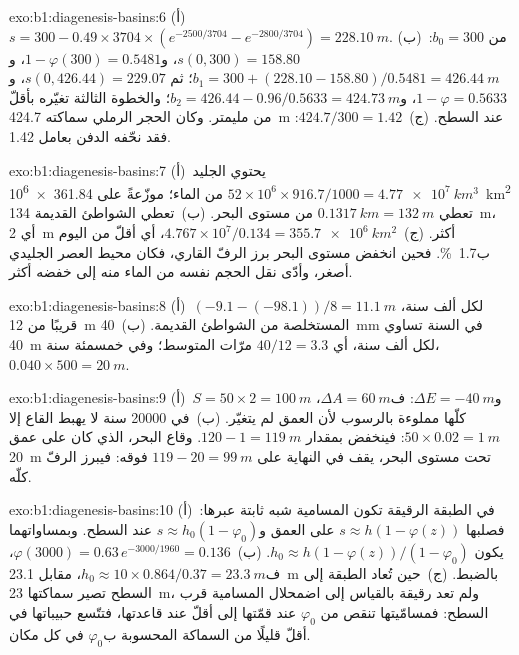\begin{solution}{exo:b1:diagenesis-basins:6}
(أ)~$s = 300 - 0.49\times3704\times(e^{-2500/3704} - e^{-2800/3704}) =
\qty{228.10}{m}$. (ب)~من $b_0 = 300$: $s(0, 300) = 158.80$، و$1 - \varphi(300) =
0.5481$، و$b_1 = 300 + (228.10 - 158.80)/0.5481 = \qty{426.44}{m}$؛ ثم
$s(0, 426.44) = 229.07$، و$1 - \varphi = 0.5633$، و$b_2 = 426.44 - 0.96/0.5633 =
\qty{424.73}{m}$؛ والخطوة الثالثة تغيّره بأقلّ من مليمتر. وكان الحجر الرملي سماكته \qty{424.7}{m} عند السطح. (ج)~$424.7/300 = 1.42$: فقد نحّفه الدفن بعامل \num{1.42}.
\end{solution}

\begin{solution}{exo:b1:diagenesis-basins:7}
(أ)~يحتوي الجليد $52\times10^6\times916.7/1000 = \qty{4.77e7}{km^3}$ من الماء؛ موزّعةً على \qty{361.84e6}{km^2} تعطي $\qty{0.1317}{km} = \qty{132}{m}$ من مستوى البحر. (ب)~تعطي الشواطئ القديمة \qty{134}{m}، أي \qty{2}{m} أكثر. (ج)~$4.767\times
10^7/0.134 = \qty{355.7e6}{km^2}$، أي أقلّ من اليوم ب\qty{1.7}{\%}. فحين انخفض مستوى البحر برز الرفّ القاري، فكان محيط العصر الجليدي أصغر، وأدّى نقل الحجم نفسه من الماء منه إلى خفضه أكثر.
\end{solution}

\begin{solution}{exo:b1:diagenesis-basins:8}
(أ)~$(-9.1 - (-98.1))/8 = \qty{11.1}{m}$ لكل ألف سنة، قريبًا من \qty{12}{m} المستخلصة من الشواطئ القديمة. (ب)~\qty{40}{mm} في السنة تساوي \qty{40}{m} لكل ألف سنة، أي $40/12 = 3.3$ مرّات المتوسط؛ وفي خمسمئة سنة، $0.040\times500 = \qty{20}{m}$.
\end{solution}

\begin{solution}{exo:b1:diagenesis-basins:9}
(أ)~$S = 50\times2 = \qty{100}{m}$ و$\Delta E = \qty{-40}{m}$: ف$\Delta A = \qty{60}{m}$، كلّها مملوءة بالرسوب لأن العمق لم يتغيّر. (ب)~في \num{20000} سنة لا يهبط القاع إلا $50\times0.02 = \qty{1}{m}$: فينخفض  بمقدار $120 - 1 = \qty{119}{m}$. وقاع البحر، الذي كان على عمق \qty{20}{m} تحت مستوى البحر، يقف في النهاية على $119 - 20 = \qty{99}{m}$ فوقه: فيبرز الرفّ كلّه.
\end{solution}

\begin{solution}{exo:b1:diagenesis-basins:10}
(أ)~في الطبقة الرقيقة تكون المسامية شبه ثابتة عبرها: فصلبها $s \approx h(1 - \varphi(z))$ على العمق و$s \approx h_0(1 -
\varphi_0)$ عند السطح. وبمساواتهما يكون $h_0 \approx h(1 -
\varphi(z))/(1 - \varphi_0)$. (ب)~$\varphi(3000) = 0.63\,e^{-3000/1960} =
0.136$، ف$h_0 \approx 10\times0.864/0.37 = \qty{23.3}{m}$، مقابل \qty{23.1}{m} بالضبط. (ج)~حين تُعاد الطبقة إلى السطح تصير سماكتها \qty{23}{m}، ولم تعد رقيقة بالقياس إلى اضمحلال المسامية قرب السطح: فمسامّيتها تنقص من $\varphi_0$ عند قمّتها إلى أقلّ عند قاعدتها، فتتّسع حبيباتها في أقلّ قليلًا من السماكة المحسوبة ب$\varphi_0$ في كل مكان.
\end{solution}

